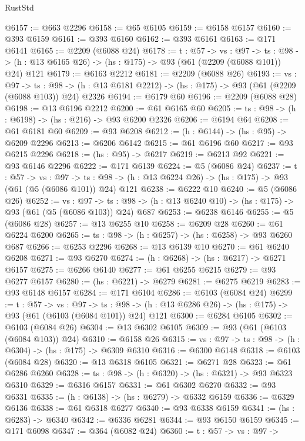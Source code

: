 \begin{lexlean}{RustStd}
\begin{coremodule}
@6157 := @663 @2296
@6158 := @65 @6105
@6159 := @6158 @6157
@6160 := @393 @6159
@6161 := @393 @6160
@6162 := @393 @6161
@6163 := @171 @6141
@6165 := @2209 (@6088 @24)
@6178 := {t : @57} ->
  {vs : @97} ->
  {ts : @98} -> (h : @13 @6165 @26) -> (hs : @175) -> @93 (@61 (@2209 (@6088 @101)) @24) @121
@6179 := @6163 @2212
@6181 := @2209 (@6088 @26)
@6193 := {vs : @97} ->
  {ts : @98} -> (h : @13 @6181 @2212) -> (hs : @175) -> @93 (@61 (@2209 (@6088 @103)) @24) @2326
@6194 := @6179 @60
@6196 := @2209 (@6088 @28)
@6198 := @13 @6196 @2212
@6200 := @61 @6165 @60
@6205 := {ts : @98} -> (h : @6198) -> (hs : @216) -> @93 @6200 @2326
@6206 := @6194 @64
@6208 := @61 @6181 @60
@6209 := @93 @6208
@6212 := (h : @6144) -> (hs : @95) -> @6209 @2296
@6213 := @6206 @6142
@6215 := @61 @6196 @60
@6217 := @93 @6215 @2296
@6218 := (hs : @95) -> @6217
@6219 := @6213 @92
@6221 := @93 @6146 @2296
@6222 := @171 @6139
@6224 := @5 (@6086 @24)
@6237 := {t : @57} ->
  {vs : @97} ->
  {ts : @98} -> (h : @13 @6224 @26) -> (hs : @175) -> @93 (@61 (@5 (@6086 @101)) @24) @121
@6238 := @6222 @10
@6240 := @5 (@6086 @26)
@6252 := {vs : @97} ->
  {ts : @98} -> (h : @13 @6240 @10) -> (hs : @175) -> @93 (@61 (@5 (@6086 @103)) @24) @687
@6253 := @6238 @6146
@6255 := @5 (@6086 @28)
@6257 := @13 @6255 @10
@6258 := @6209 @28
@6260 := @61 @6224 @6200
@6265 := {ts : @98} -> (h : @6257) -> (hs : @6258) -> @93 @6260 @687
@6266 := @6253 @2296
@6268 := @13 @6139 @10
@6270 := @61 @6240 @6208
@6271 := @93 @6270
@6274 := (h : @6268) -> (hs : @6217) -> @6271 @6157
@6275 := @6266 @6140
@6277 := @61 @6255 @6215
@6279 := @93 @6277 @6157
@6280 := (hs : @6221) -> @6279
@6281 := @6275 @6219
@6283 := @93 @6148 @6157
@6284 := @171 @6104
@6286 := @6103 (@6084 @24)
@6299 := {t : @57} ->
  {vs : @97} ->
  {ts : @98} -> (h : @13 @6286 @26) -> (hs : @175) -> @93 (@61 (@6103 (@6084 @101)) @24) @121
@6300 := @6284 @6105
@6302 := @6103 (@6084 @26)
@6304 := @13 @6302 @6105
@6309 := @93 (@61 (@6103 (@6084 @103)) @24)
@6310 := @6158 @26
@6315 := {vs : @97} -> {ts : @98} -> (h : @6304) -> (hs : @175) -> @6309 @6310
@6316 := @6300 @6148
@6318 := @6103 (@6084 @28)
@6320 := @13 @6318 @6105
@6321 := @6271 @28
@6323 := @61 @6286 @6260
@6328 := {ts : @98} -> (h : @6320) -> (hs : @6321) -> @93 @6323 @6310
@6329 := @6316 @6157
@6331 := @61 @6302 @6270
@6332 := @93 @6331
@6335 := (h : @6138) -> (hs : @6279) -> @6332 @6159
@6336 := @6329 @6136
@6338 := @61 @6318 @6277
@6340 := @93 @6338 @6159
@6341 := (hs : @6283) -> @6340
@6342 := @6336 @6281
@6344 := @93 @6150 @6159
@6345 := @171 @6098
@6347 := @364 (@6082 @24)
@6360 := {t : @57} ->
  {vs : @97} ->

\end{coremodule}
\end{lexlean}
